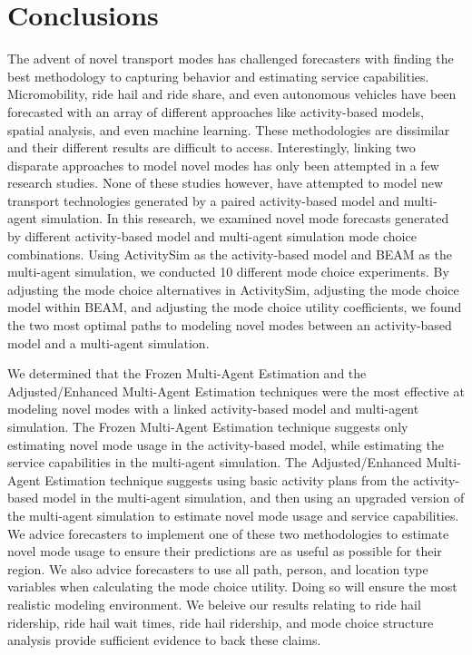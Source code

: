 \documentclass[12pt, oneside, openright]{byuthesis}
\begin{document}
\hypertarget{conclusions}{%
\chapter{Conclusions}\label{conclusions}}

The advent of novel transport modes has challenged forecasters with finding the best methodology to capturing behavior and estimating service capabilities. Micromobility, ride hail and ride share, and even autonomous vehicles have been forecasted with an array of different approaches like activity-based models, spatial analysis, and even machine learning. These methodologies are dissimilar and their different results are difficult to access. Interestingly, linking two disparate approaches to model novel modes has only been attempted in a few research studies. None of these studies however, have attempted to model new transport technologies generated by a paired activity-based model and multi-agent simulation. In this research, we examined novel mode forecasts generated by different activity-based model and multi-agent simulation mode choice combinations. Using ActivitySim as the activity-based model and BEAM as the multi-agent simulation, we conducted 10 different mode choice experiments. By adjusting the mode choice alternatives in ActivitySim, adjusting the mode choice model within BEAM, and adjusting the mode choice utility coefficients, we found the two most optimal paths to modeling novel modes between an activity-based model and a multi-agent simulation.

We determined that the Frozen Multi-Agent Estimation and the Adjusted/Enhanced Multi-Agent Estimation techniques were the most effective at modeling novel modes with a linked activity-based model and multi-agent simulation. The Frozen Multi-Agent Estimation technique suggests only estimating novel mode usage in the activity-based model, while estimating the service capabilities in the multi-agent simulation. The Adjusted/Enhanced Multi-Agent Estimation technique suggests using basic activity plans from the activity-based model in the multi-agent simulation, and then using an upgraded version of the multi-agent simulation to estimate novel mode usage and service capabilities. We advice forecasters to implement one of these two methodologies to estimate novel mode usage to ensure their predictions are as useful as possible for their region. We also advice forecasters to use all path, person, and location type variables when calculating the mode choice utility. Doing so will ensure the most realistic modeling environment. We beleive our results relating to ride hail ridership, ride hail wait times, ride hail ridership, and mode choice structure analysis provide sufficient evidence to back these claims.
\end{document}
